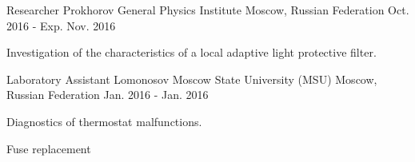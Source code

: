 \begin{cventries}
  \cventry
    {Researcher} %
    {Prokhorov General Physics Institute} %
    {Moscow, Russian Federation} %
    {Oct. 2016 - Exp. Nov. 2016} %
    {
      \begin{cvitems} %
        \item {Investigation of the characteristics of a local adaptive light protective filter.}
      \end{cvitems}
    }

  \cventry
    {Laboratory Assistant} %
    {Lomonosov Moscow State University (MSU)} %
    {Moscow, Russian Federation} %
    {Jan. 2016 - Jan. 2016} %
    {
      \begin{cvitems} %
        \item {Diagnostics of thermostat malfunctions.}
        \item {Fuse replacement}
      \end{cvitems}
    }

\end{cventries}
